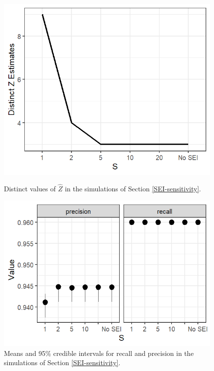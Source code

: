 \documentclass[ba]{imsart}
\begin{document}
\begin{figure}
	\begin{minipage}[c]{0.4\linewidth}
		\begin{center}
		\includegraphics[width=\linewidth]{../SEI_sensitivity/Z_plot}
		\caption{Distinct values of $\hat{Z}$ in the simulations of Section \ref{SEI-sensitivity}.}
		\label{fig:SEI_Z}
		\end{center}
	\end{minipage}
	\hfill
	\begin{minipage}[c]{0.5\linewidth}
		\begin{center}
		\includegraphics[width=\linewidth]{../SEI_sensitivity/eval_plot} 
		\caption{Means and 95\% credible intervals for recall and precision in the simulations of Section \ref{SEI-sensitivity}.}
		\label{fig:SEI_eval}
	\end{center}
	\end{minipage}%
\end{figure}
\end{document}
